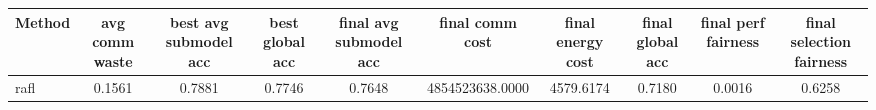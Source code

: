 \begin{tabular}{lccccccccc}
\toprule
Method & avg comm waste & best avg submodel acc & best global acc & final avg submodel acc & final comm cost & final energy cost & final global acc & final perf fairness & final selection fairness \\
\midrule
rafl & 0.1561 & 0.7881 & 0.7746 & 0.7648 & 4854523638.0000 & 4579.6174 & 0.7180 & 0.0016 & 0.6258 \\
\bottomrule
\end{tabular}

